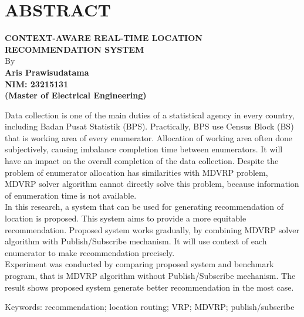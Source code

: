 %
%
%

\singlespacing
\chapter*{ABSTRACT}
\medskip
\begin{center}
	{\large \textbf{CONTEXT-AWARE REAL-TIME LOCATION RECOMMENDATION SYSTEM}} \\
	\medskip
	By \\
	{\large \textbf{Aris Prawisudatama}} \\
	{\large \textbf{NIM: 23215131}} \\
	{\large \textbf{(Master of Electrical Engineering)}}
\end{center}
\medskip
\medskip
\medskip
\noindent Data collection is one of the main duties of a statistical agency in every country, including Badan Pusat Statistik (BPS). Practically, BPS use Census Block (BS) that is working area of every enumerator. Allocation of working area often done subjectively, causing imbalance completion time between enumerators. It will have an impact on the overall completion of the data collection. Despite the problem of enumerator allocation has similarities with MDVRP problem, MDVRP solver algorithm cannot directly solve this problem, because information of enumeration time is not available. \\

\noindent In this research, a system that can be used for generating recommendation of location is proposed. This system aims to provide a more equitable recommendation. Proposed system works gradually, by combining MDVRP solver algorithm with Publish/Subscribe mechanism. It will use context of each enumerator to make recommendation precisely.\\

\noindent Experiment was conducted by comparing proposed system and benchmark program, that is MDVRP algorithm without Publish/Subscribe mechanism. The result shows proposed system generate better recommendation in the most case.

\vspace*{0.2cm}

\noindent Keywords: recommendation; location routing; VRP; MDVRP; publish/subscribe \\

\onehalfspacing
\newpage